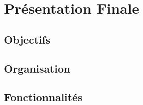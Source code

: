 \section{Présentation Finale}
\subsection{Objectifs}
\subsection{Organisation}
\subsection{Fonctionnalités}
